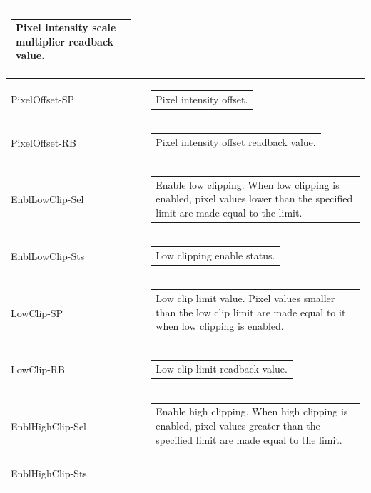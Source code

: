 \documentclass[openany]{article}
\begin{document}
\begin{longtable}{| m{3.0cm} m{4.5cm} m{7.0cm} |}
\begin{tabular}{@{}m{6cm}@{}}
                Pixel intensity scale multiplier readback value.
            \end{tabular} \hypertarget{}{}\\ \hline
        PixelOffset-SP &  & \begin{tabular}{@{}m{6cm}@{}}
                Pixel intensity offset.
            \end{tabular} \\ \hline
        PixelOffset-RB &  & \begin{tabular}{@{}m{6cm}@{}}
                Pixel intensity offset readback value.
            \end{tabular} \hypertarget{}{}\\ \hline
        EnblLowClip-Sel &  & \begin{tabular}{@{}m{6cm}@{}}
                Enable low clipping. When low clipping is enabled,
                pixel values lower than the specified limit are made equal to the
                limit.
            \end{tabular} \\ \hline
        EnblLowClip-Sts &  & \begin{tabular}{@{}m{6cm}@{}}
                Low clipping enable status.
            \end{tabular} \hypertarget{}{}\\ \hline
        LowClip-SP &  & \begin{tabular}{@{}m{6cm}@{}}
                Low clip limit value. Pixel values smaller than the low
                clip limit are made equal to it when low clipping is enabled.
            \end{tabular} \\ \hline
        LowClip-RB &  & \begin{tabular}{@{}m{6cm}@{}}
	        Low clip limit readback value.
            \end{tabular} \hypertarget{}{}\\ \hline
        EnblHighClip-Sel &  & \begin{tabular}{@{}m{6cm}@{}}
                Enable high clipping. When high clipping is enabled,
                pixel values greater than the specified limit are made equal to the
                limit.
            \end{tabular} \\ \hline
        EnblHighClip-Sts &  & \begin{tabular}{@{}m{6cm}@{}}

\end{tabular}
\end{longtable}
\end{document}
